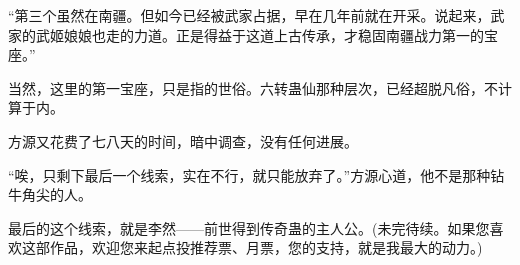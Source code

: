 \begin{this_body}
“第三个虽然在南疆。但如今已经被武家占据，早在几年前就在开采。说起来，武家的武姬娘娘也走的力道。正是得益于这道上古传承，才稳固南疆战力第一的宝座。”

当然，这里的第一宝座，只是指的世俗。六转蛊仙那种层次，已经超脱凡俗，不计算于内。

方源又花费了七八天的时间，暗中调查，没有任何进展。

“唉，只剩下最后一个线索，实在不行，就只能放弃了。”方源心道，他不是那种钻牛角尖的人。

最后的这个线索，就是李然——前世得到传奇蛊的主人公。(未完待续。如果您喜欢这部作品，欢迎您来起点投推荐票、月票，您的支持，就是我最大的动力。)

\end{this_body}

